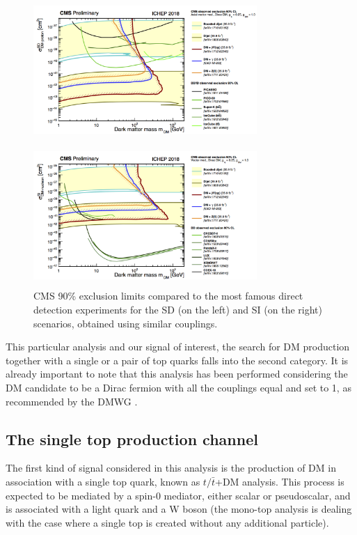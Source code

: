\documentclass[a4paper, 10pt, openright]{report}
\begin{document}
\begin{figure}[htbp]
\centering
\begin{minipage}[b]{.47\textwidth}
\includegraphics[width=8.5cm, height=5.4cm]{figs/SDDD.png}
\end{minipage}\hfill
\begin{minipage}[b]{.47\textwidth}
\includegraphics[width=8.5cm, height=5.4cm]{figs/SIDD.png}
\end{minipage} \hfill
\caption{\ac{CMS} 90\% exclusion limits compared to the most famous direct detection experiments for the \ac{SD} (on the left) and \ac{SI} (on the right) scenarios, obtained using similar couplings.}
\label{fig:DDComparison}
\end{figure}

This particular analysis and our signal of interest, the search for \ac{DM} production together with a single or a pair of top quarks falls into the second category. It is already important to note that this analysis has been performed considering the \ac{DM} candidate to be a Dirac fermion with all the couplings equal and set to 1, as recommended by the \ac{DMWG} \cite{DMWG}.

\subsection{The single top production channel} \label{subsection:singleTopChannel}

The first kind of signal considered in this analysis is the production of \ac{DM} in association with a single top quark, known as $t/\bar t$+DM analysis. This process is expected to be mediated by a spin-0 mediator, either scalar or pseudoscalar, and is associated with a light quark and a W boson (the mono-top analysis is dealing with the case where a single top is created without any additional particle). 
\end{document}
